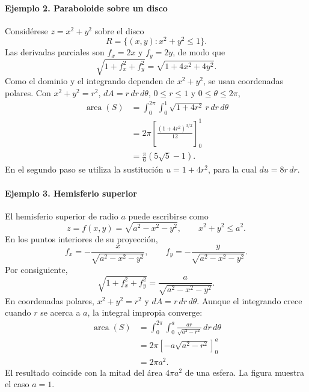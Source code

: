 \paragraph{Ejemplo 2. Paraboloide sobre un disco}
Considérese $z=x^2+y^2$ sobre el disco
\[
R=\{(x,y):x^2+y^2\leq1\}.
\]
Las derivadas parciales son $f_x=2x$ y $f_y=2y$, de modo que
\[
\sqrt{1+f_x^2+f_y^2}
=\sqrt{1+4x^2+4y^2}.
\]
Como el dominio y el integrando dependen de $x^2+y^2$, se usan coordenadas polares. Con $x^2+y^2=r^2$, $dA=r\,dr\,d\theta$, $0\leq r\leq1$ y $0\leq\theta\leq2\pi$,
\begin{align*}
\operatorname{area}(S)
&=\int_0^{2\pi}\int_0^1\sqrt{1+4r^2}\,r\,dr\,d\theta\\
&=2\pi\left[\frac{(1+4r^2)^{3/2}}{12}\right]_{0}^{1}\\
&=\frac{\pi}{6}\left(5\sqrt5-1\right).
\end{align*}
En el segundo paso se utiliza la sustitución $u=1+4r^2$, para la cual $du=8r\,dr$.

\begingroup\shorthandoff{>}
\begin{center}
\end{center}
\endgroup

\paragraph{Ejemplo 3. Hemisferio superior}
El hemisferio superior de radio $a$ puede escribirse como
\[
z=f(x,y)=\sqrt{a^2-x^2-y^2},
\qquad x^2+y^2\leq a^2.
\]
En los puntos interiores de su proyección,
\[
f_x=-\frac{x}{\sqrt{a^2-x^2-y^2}},
\qquad
f_y=-\frac{y}{\sqrt{a^2-x^2-y^2}}.
\]
Por consiguiente,
\[
\sqrt{1+f_x^2+f_y^2}
=\frac{a}{\sqrt{a^2-x^2-y^2}}.
\]
En coordenadas polares, $x^2+y^2=r^2$ y $dA=r\,dr\,d\theta$. Aunque el integrando crece cuando $r$ se acerca a $a$, la integral impropia converge:
\begin{align*}
\operatorname{area}(S)
&=\int_0^{2\pi}\int_0^a
\frac{ar}{\sqrt{a^2-r^2}}\,dr\,d\theta\\
&=2\pi\left[-a\sqrt{a^2-r^2}\right]_{0}^{a}\\
&=2\pi a^2.
\end{align*}
El resultado coincide con la mitad del área $4\pi a^2$ de una esfera. La figura muestra el caso $a=1$.

